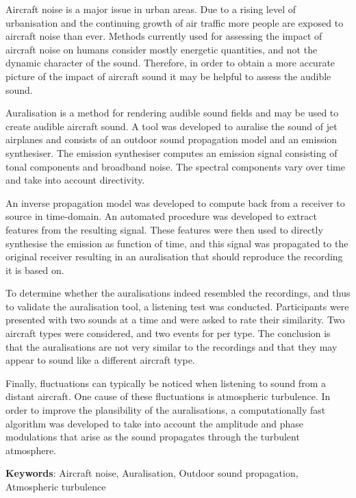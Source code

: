 Aircraft noise is a major issue in urban areas. Due to a rising level of
urbanisation and the continuing growth of air traffic more people are exposed to
aircraft noise than ever. Methods currently used for assessing the
impact of aircraft noise on humans consider mostly energetic quantities, and not the
dynamic character of the sound. Therefore, in order to obtain a more accurate
picture of the impact of aircraft sound it may be helpful to assess the audible
sound.

Auralisation is a method for rendering audible sound fields and may be used to
create audible aircraft sound. A tool was developed to auralise the sound of jet
airplanes and consists of an outdoor sound propagation model and an emission synthesiser.
The emission synthesiser computes an emission signal consisting of tonal
components and broadband noise. The spectral components vary over time and take
into account directivity.

An inverse propagation model was developed to compute back from a receiver to
source in time-domain. An automated procedure was developed to extract features
from the resulting signal. These features were then used to directly synthesise
the emission as function of time, and this signal was propagated to the original
receiver resulting in an auralisation that should reproduce the recording
it is based on.

To determine whether the auralisations indeed resembled the recordings, and thus
to validate the auralisation tool, a listening test was conducted. Participants
were presented with two sounds at a time and were asked to rate their similarity.
Two aircraft types were considered, and two events for per type.
The conclusion is that the auralisations are not very similar to the recordings
and that they may appear to sound like a different aircraft type.

Finally, fluctuations can typically be noticed when listening to sound from a
distant aircraft. One cause of these fluctuations is atmospheric turbulence. In
order to improve the plausibility of the auralisations, a
computationally fast algorithm was developed to take into account the amplitude
and phase modulations that arise as the sound propagates through the turbulent
atmosphere.



\vspace{0.1cm}

\textbf{Keywords}: Aircraft noise, Auralisation, Outdoor sound propagation, Atmospheric turbulence

